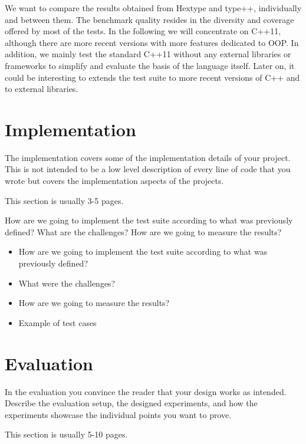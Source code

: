 \documentclass[a4paper,11pt,oneside]{report}
\begin{document}
We want to compare the results obtained from Hextype and type++, individually and between them. The benchmark quality resides 
in the diversity and coverage offered by most of the tests. In the following we will concentrate on C++11,
although there are more recent versions with more features dedicated to OOP. In addition, we mainly test the standard
C++11 without any external libraries or frameworks to simplify and evaluate the basis of the language itself. Later on,
it could be interesting to extends the test suite to more recent versions of C++ and to external libraries. 

\chapter{Implementation}

The implementation covers some of the implementation details of your project.
This is not intended to be a low level description of every line of code that
you wrote but covers the implementation aspects of the projects.

This section is usually 3-5 pages.

How are we going to implement the test suite according to what was previously defined? What are the challenges? 
How are we going to measure the results?

\begin{itemize}
       \item How are we going to implement the test suite according to what was previously defined? 
       \item What were the challenges?
       \item How are we going to measure the results?
       \item Example of test cases
\end{itemize}


\chapter{Evaluation}

In the evaluation you convince the reader that your design works as intended.
Describe the evaluation setup, the designed experiments, and how the
experiments showcase the individual points you want to prove.

This section is usually 5-10 pages.
\end{document}
